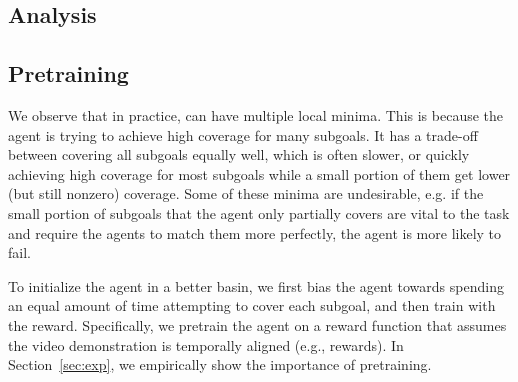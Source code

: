 \subsection{Analysis\label{subsec:orca_analysis}}


\subsection{Pretraining}

We observe that in practice, \orca{} can have multiple local minima.
This is because the agent is trying to achieve high coverage for many subgoals. It has a trade-off between covering all subgoals equally well, which is often slower, or quickly achieving high coverage for most subgoals while a small portion of them get lower (but still nonzero) coverage.
Some of these minima are undesirable, e.g. if the small portion of subgoals that the agent only partially covers are vital to the task and require the agents to match them more perfectly, the agent is more likely to fail.

To initialize the agent in a better basin, we first bias the agent towards spending an equal amount of time attempting to cover each subgoal, and then train with the \orca{} reward. 
Specifically, we pretrain the agent on a reward function that assumes the video demonstration is temporally aligned  (e.g., \tot{} rewards). 
In Section~\ref{sec:exp}, we empirically show the importance of pretraining. 




